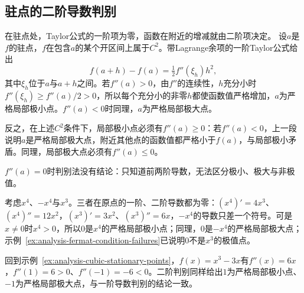 \subsection{驻点的二阶导数判别}
在驻点处，Taylor公式的一阶项为零，函数在附近的增减就由二阶项决定。
设$a$是$f$的驻点，$f$在包含$a$的某个开区间上属于$C^2$。带Lagrange余项的一阶Taylor公式给出
\[
 f(a+h)-f(a)=\tfrac12f''(\xi_h)h^2,
\]
其中$\xi_h$位于$a$与$a+h$之间。若$f''(a)>0$，由$f''$的连续性，$h$充分小时$f''(\xi_h)\geq f''(a)/2>0$，所以每个充分小的非零$h$都使函数值严格增加，$a$为严格局部极小点。$f''(a)<0$时同理，$a$为严格局部极大点。

反之，在上述$C^2$条件下，局部极小点必须有$f''(a)\geq0$：若$f''(a)<0$，上一段说明$a$是严格局部极大点，附近其他点的函数值都严格小于$f(a)$，与局部极小矛盾。同理，局部极大点必须有$f''(a)\leq0$。

$f''(a)=0$时判别法没有结论：只知道前两阶导数，无法区分极小、极大与非极值。
\begin{example}[二阶导数为零时无法判别]
\label{ex:analysis-second-derivative-test-inconclusive}
考虑$x^4$、$-x^4$与$x^3$。三者在原点的一阶、二阶导数都为零：$(x^4)'=4x^3$、$(x^4)''=12x^2$，$(x^3)'=3x^2$、$(x^3)''=6x$，$-x^4$的导数只差一个符号。可是$x\neq0$时$x^4>0$，所以$0$是$x^4$的严格局部极小点；同理，$0$是$-x^4$的严格局部极大点；示例~\ref{ex:analysis-fermat-condition-failures}已说明$0$不是$x^3$的极值点。
\end{example}
回到示例~\ref{ex:analysis-cubic-stationary-points}，$f(x)=x^3-3x$有$f''(x)=6x$，$f''(1)=6>0$、$f''(-1)=-6<0$。二阶判别同样给出$1$为严格局部极小点、$-1$为严格局部极大点，与一阶导数判别的结论一致。

\FloatBarrier
